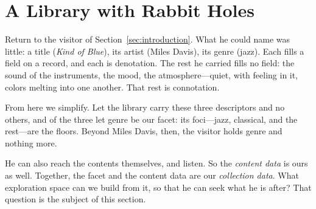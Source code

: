 \section{A Library with Rabbit Holes}\label{sec:framework}

Return to the visitor of Section~\ref{sec:introduction}. What he could name
was little: a title (\textit{Kind of Blue}), its artist (Miles Davis), its
genre (jazz). Each fills a field on a record, and each is denotation. The
rest he carried fills no field: the sound of the instruments, the mood, the
atmosphere---quiet, with feeling in it, colors melting into one another.
That rest is connotation.

From here we simplify. Let the library carry these three descriptors and no
others, and of the three let genre be our facet: its foci---jazz, classical,
and the rest---are the floors. Beyond Miles Davis, then, the visitor holds
genre and nothing more.

He can also reach the contents themselves, and listen. So the \emph{content
    data} is ours as well. Together, the facet and the content data are our
\emph{collection data}. What exploration space can we build from it, so that
he can seek what he is after? That question is the subject of this section.


